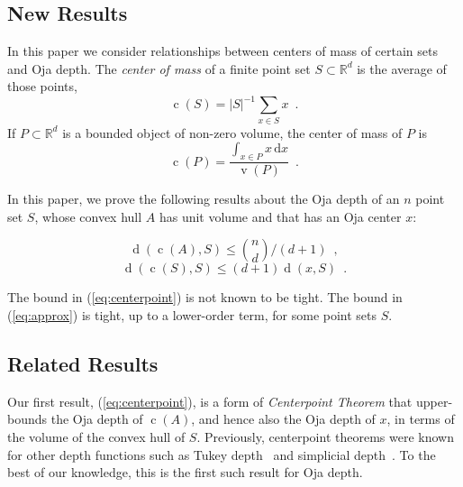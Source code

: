 \documentclass[preprint, 12pt]{elsarticle}
\DeclareMathOperator{\od}{d}
\DeclareMathOperator{\vol}{v}
\DeclareMathOperator{\cog}{c}
\newcommand{\R}{\mathbb{R}}
\newcommand{\ud}{\mathrm{d}}
\newcommand{\eqlabel}[1]{\label{eq:#1}}
\renewcommand{\eqref}[1]{(\ref{eq:#1})}
\begin{document}
\subsection{New Results}

In this paper we consider relationships between centers of mass of
certain sets and Oja depth. The \emph{center of mass} of a finite
point set $S\subset\R^d$ is the average of those points,
\[
  \cog(S) = |S|^{-1}\sum_{x\in S} x \enspace .
\]
If $P\subset\R^d$ is a bounded object of non-zero volume, the center of mass of $P$ is
\[
  \cog(P) = \frac{\int_{x \in P} x\, \ud x}{\vol(P)} \enspace .
\]

In this paper, we prove the following results about the Oja depth of an
$n$ point set $S$, whose convex hull $A$ has unit volume and that has an Oja center $x$:

\begin{equation}
  \od(\cog(A),S) \le \binom{n}{d}/(d+1) \enspace ,
   \eqlabel{centerpoint}
\end{equation}
\begin{equation}
  \od(\cog(S),S) \le (d+1)\od(x,S) \enspace .
   \eqlabel{approx}
\end{equation}

The bound in \eqref{centerpoint} is not known to be tight. The bound
in \eqref{approx} is tight, up to a lower-order term, for some point
sets $S$.

\subsection{Related Results}

Our first result, \eqref{centerpoint}, is a form of \emph{Centerpoint
Theorem} that upper-bounds the Oja depth of $\cog(A)$, and hence
also the Oja depth of $x$, in terms of the volume of the convex hull
of $S$.  Previously, centerpoint theorems were known for other depth
functions such as Tukey depth~\cite{m02,pa95,t71} and simplicial depth~\cite{b82,bf84,l90}.  To the best of our knowledge, this is the first
such result for Oja depth.
\end{document}
